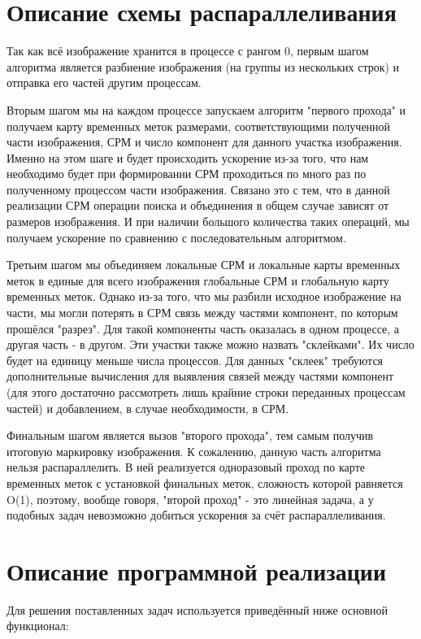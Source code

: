 \documentclass{report}
\begin{document}
\begin{itemize}
\begin{itemize}
	\section*{Описание схемы распараллеливания}
		\par Так как всё изображение хранится в процессе с рангом 0, первым шагом алгоритма является разбиение изображения (на группы из нескольких строк) и отправка его частей другим процессам.
		\par Вторым шагом мы на каждом процессе запускаем алгоритм "первого прохода" и получаем карту временных меток размерами, соответствующими полученной части изображения, СРМ и число компонент для данного участка изображения. Именно на этом шаге и будет происходить ускорение из-за того, что нам необходимо будет при формировании СРМ проходиться по много раз по полученному процессом части изображения. Связано это с тем, что в данной реализации СРМ операции поиска и объединения в общем случае зависят от размеров изображения. И при наличии большого количества таких операций, мы получаем ускорение по сравнению с последовательным алгоритмом.
		\par Третьим шагом мы объединяем локальные СРМ и локальные карты временных меток в единые для всего изображения глобальные СРМ и глобальную карту временных меток. Однако из-за того, что мы разбили исходное изображение на части, мы могли потерять в СРМ связь между частями компонент, по которым прошёлся "разрез". Для такой компоненты часть оказалась в одном процессе, а другая часть - в другом. Эти участки также можно назвать "склейками". Их число будет на единицу меньше числа процессов. Для данных "склеек" требуются дополнительные вычисления для выявления связей между частями компонент (для этого достаточно рассмотреть лишь крайние строки переданных процессам частей) и добавлением, в случае необходимости, в СРМ.
		\par Финальным шагом является вызов "второго прохода"{}, тем самым получив итоговую маркировку изображения. К сожалению, данную часть алгоритма нельзя распараллелить. В ней реализуется одноразовый проход по карте временных меток с установкой финальных меток, сложность которой равняется O(1), поэтому, вообще говоря, "второй проход"{} - это линейная задача, а у подобных задач невозможно добиться ускорения за счёт распараллеливания.
	\newpage


	\section*{Описание программной реализации}
		\par Для решения поставленных задач используется приведённый ниже основной функционал:


\end{itemize}
\end{itemize}
\end{document}
